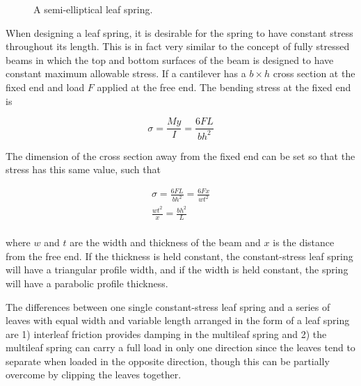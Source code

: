 \documentclass[a4paper,openany,12pt]{book}
\begin{document}
{{\begin{figure}[h]
  \centering
  \caption{A semi-elliptical leaf spring.}
  \label{fig: leaf springs}
\end{figure}

When designing a leaf spring, it is desirable for the spring to have
constant stress throughout its length. This is in fact very similar to
the concept of fully stressed beams in which the top and bottom surfaces
of the beam is designed to have constant maximum allowable stress. If a
cantilever has a \(b \times h\) cross section at the fixed end and load
\(F\) applied at the free end. The bending stress at the fixed end is

$$\sigma  = \frac{My}{I} = \frac{6FL}{bh^2}$$

The dimension of the cross section away from the fixed end can be set so
that the stress has this same value, such that

$$\begin{gathered}
    \sigma  = \frac{6FL}{bh^2} = \frac{6Fx}{wt^2} \\
    \frac{wt^2}{x} = \frac{bh^2}{L} \\ 
  \end{gathered}$$

where \(w\) and \(t\) are the width and thickness of the beam and \(x\) is the
distance from the free end. If the thickness is held constant, the
constant-stress leaf spring will have a triangular profile width, and if
the width is held constant, the spring will have a parabolic profile
thickness.

The differences between one single constant-stress leaf spring and a
series of leaves with equal width and variable length arranged in the
form of a leaf spring are 1) interleaf friction provides damping in the
multileaf spring and 2) the multileaf spring can carry a full load in
only one direction since the leaves tend to separate when loaded in the
opposite direction, though this can be partially overcome by clipping
the leaves together.

}}
\end{document}
